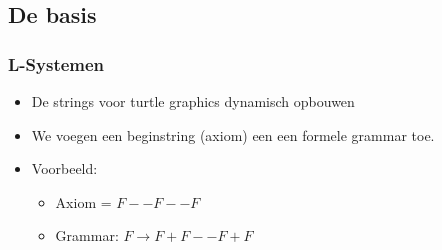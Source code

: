 \documentclass[ignorenonframetext,compress]{beamer}
\begin{document}
\subsection{De basis}
\begin{frame}[fragile]
	\frametitle{L-Systemen}
\begin{itemize}
\item De strings voor turtle graphics dynamisch opbouwen
\item We voegen een beginstring (axiom) een een formele grammar toe.
\pause
\item Voorbeeld:
	\begin{itemize}
	\item Axiom = $F--F--F$
	\item Grammar: $F \rightarrow F+F--F+F$
	\end{itemize}
\end{itemize}
\end{frame}
\end{document}
